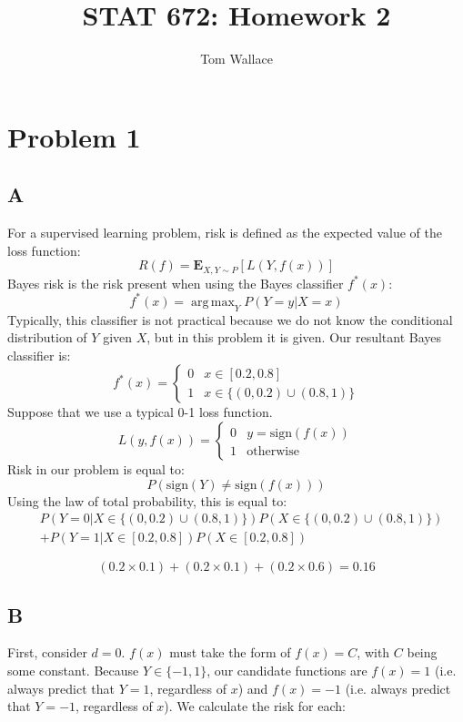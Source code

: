 \documentclass{report}
\title{STAT 672: Homework 2}
\author{Tom Wallace}
\DeclareMathOperator*{\argmax}{arg\,max}
\begin{document}
\maketitle

\section*{Problem 1}

\subsection*{A}

For a supervised learning problem, risk is defined as the expected value
of the loss function:
$$
R(f) = \mathbf{E}_{X, Y \sim P}[L(Y, f(x))]
$$
Bayes risk is the risk present when using the Bayes classifier $f^*(x)$:
$$f^*(x) = \argmax_Y P(Y=y|X=x)$$
Typically, this classifier is not practical because we do not know the
conditional distribution of $Y$ given $X$, but in this problem it is given.
Our resultant Bayes classifier is:
$$
f^*(x) = 
\begin{cases}
0 & x \in [0.2, 0.8] \\
1 & x \in \{(0, 0.2) \cup (0.8, 1)\} 
\end{cases}
$$
Suppose that we use a typical 0-1 loss function.  
$$
L(y, f(x)) = 
\begin{cases} 
	0 & y = \mathrm{sign}(f(x)) \\ 
	1 & \mathrm{otherwise}
\end{cases}
$$
Risk in our problem is equal to:
$$
P(\mathrm{sign}(Y) \neq \mathrm{sign}(f(x)))
$$
Using the law of total probability, this is equal to:
\begin{equation}
	\begin{split}
	& P(Y=0|X \in \{(0, 0.2) \cup (0.8, 1)\})P(X \in \{(0, 0.2) \cup (0.8,
	1)\}) \\
	& + P(Y=1|X \in [0.2, 0.8])P(X \in [0.2, 0.8]) 
	\end{split}
\end{equation}

$$
(0.2 \times 0.1) + (0.2 \times 0.1) + (0.2 \times 0.6) = 0.16
$$

\subsection*{B}
First, consider $d=0$. $f(x)$ must take the form of $f(x) =
C$, with $C$ being some constant. Because $Y \in \{-1, 1\}$, our candidate functions are $f(x)
= 1$ (i.e. always predict that $Y=1$, regardless of $x$) and $f(x) = -1$ (i.e.
always predict that $Y=-1$, regardless of $x$). We calculate the risk for each:
\end{document}
